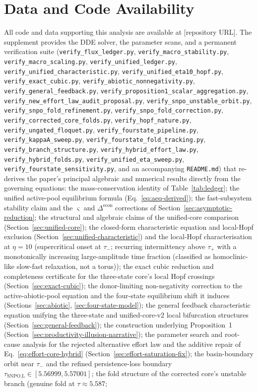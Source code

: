 \documentclass[twocolumn,10pt]{article}
\begin{document}
\section*{Data and Code Availability}\label{sec:data-code}
All code and data supporting this analysis are available at [repository URL]. The supplement provides the DDE solver, the parameter scans, and a permanent verification suite (\texttt{verify\_flux\_ledger.py}, \texttt{verify\_macro\_stability.py}, \texttt{verify\_macro\_scaling.py}, \texttt{verify\_unified\_ledger.py}, \texttt{verify\_unified\_characteristic.py}, \texttt{verify\_unified\_eta10\_hopf.py}, \texttt{verify\_exact\_cubic.py}, \texttt{verify\_abiotic\_nonnegativity.py}, \texttt{verify\_general\_feedback.py}, \texttt{verify\_proposition1\_scalar\_aggregation.py}, \texttt{verify\_new\_effort\_law\_audit\_proposal.py}, \texttt{verify\_snpo\_unstable\_orbit.py}, \texttt{verify\_snpo\_fold\_refinement.py}, \texttt{verify\_snpo\_fold\_correction.py}, \texttt{verify\_corrected\_core\_folds.py}, \texttt{verify\_hopf\_nature.py}, \texttt{verify\_ungated\_floquet.py}, \texttt{verify\_fourstate\_pipeline.py}, \texttt{verify\_kappaA\_sweep.py}, \texttt{verify\_fourstate\_fold\_tracking.py}, \texttt{verify\_branch\_structure.py}, \texttt{verify\_hybrid\_effort\_law.py}, \texttt{verify\_hybrid\_folds.py}, \texttt{verify\_unified\_eta\_sweep.py}, \texttt{verify\_fourstate\_sensitivity.py}, and an accompanying \texttt{README.md}) that re-derives the paper's principal algebraic and numerical results directly from the governing equations: the mass-conservation identity of Table~\ref{tab:ledger}; the unified active-pool equilibrium formula (Eq.~\eqref{eq:aeq-derived}); the fast-subsystem stability claim and the $\varsigma$ and $\Delta^{\text{econ}}$ corrections of Section~\ref{sec:asymptotic-reduction}; the structural and algebraic claims of the unified-core comparison (Section~\ref{sec:unified-core}); the closed-form characteristic equation and local-Hopf exclusion (Section~\ref{sec:unified-characteristic}) and the local-Hopf characterisation at $\eta=10$ (supercritical onset at $\tau_-$; recurring intermittency above $\tau_+$ with a monotonically increasing large-amplitude time fraction (classified as homoclinic-like slow-fast relaxation, not a torus)); the exact cubic reduction and completeness certificate for the three-state core's local Hopf crossings (Section~\ref{sec:exact-cubic}); the donor-limiting non-negativity correction to the active-abiotic-pool equation and the four-state equilibrium shift it induces (Sections~\ref{sec:abiotic}, \ref{sec:four-state-model}); the general feedback characteristic equation unifying the three-state and unified-core-v2 local bifurcation structures (Section~\ref{sec:general-feedback}); the construction underlying Proposition~1 (Section~\ref{sec:productivity-illusion-narrative}); the parameter search and root-cause analysis for the rejected alternative effort law and the additive repair of Eq.~\eqref{eq:effort-core-hybrid} (Section~\ref{sec:effort-saturation-fix}); the basin-boundary orbit near $\tau_-$ and the refined persistence-loss boundary $\tau_{\text{SNPO,L}}\in[5.56999,5.57001]$; the fold structure of the corrected core's unstable branch (genuine fold at $\tau\approx5.587$; 
\end{document}
